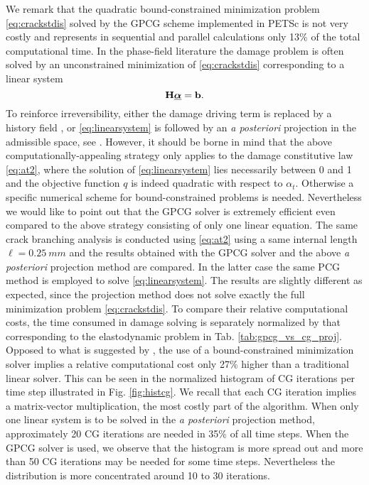 We remark that the quadratic bound-constrained minimization problem \eqref{eq:crackstdis} solved by the GPCG scheme implemented in PETSc is not very costly and represents in sequential and parallel calculations only 13\% of the total computational time. In the phase-field literature the damage problem is often solved by an unconstrained minimization of \eqref{eq:crackstdis} corresponding to a linear system
\begin{equation} \label{eq:linearsystem}
\vec{H}\dvec=\vec{b}.
\end{equation}
To reinforce irreversibility, either the damage driving term is replaced by a history field \cite{HofackerMiehe:2012,BordenVerhooselScottHughesLandis:2012}, or \eqref{eq:linearsystem} is followed by an \emph{a posteriori} projection in the admissible space, see \cite{LancioniRoyer-Carfagni:2009}. However, it should be borne in mind that the above computationally-appealing strategy only applies to the damage constitutive law \eqref{eq:at2}, where the solution of \eqref{eq:linearsystem} lies necessarily between 0 and 1 and the objective function $q$ is indeed quadratic with respect to $\alpha_t$. Otherwise a specific numerical scheme for bound-constrained problems is needed. Nevertheless we would like to point out that the GPCG solver is extremely efficient even compared to the above strategy consisting of only one linear equation. The same crack branching analysis is conducted using \eqref{eq:at2} using a same internal length $\ell=\SI{0.25}{mm}$ and the results obtained with the GPCG solver and the above \emph{a posteriori} projection method are compared. In the latter case the same PCG method is employed to solve \eqref{eq:linearsystem}. The results are slightly different as expected, since the projection method does not solve exactly the full minimization problem \eqref{eq:crackstdis}. To compare their relative computational costs, the time consumed in damage solving is separately normalized by that corresponding to the elastodynamic problem in Tab. \ref{tab:gpcg_vs_cg_proj}. Opposed to what is suggested by \cite{AmorMarigoMaurini:2009}, the use of a bound-constrained minimization solver implies a relative computational cost only 27\% higher than a traditional linear solver. This can be seen in the normalized histogram of CG iterations per time step illustrated in Fig. \ref{fig:histcg}. We recall that each CG iteration implies a matrix-vector multiplication, the most costly part of the algorithm. When only one linear system is to be solved in the \emph{a posteriori} projection method, approximately 20 CG iterations are needed in 35\% of all time steps. When the GPCG solver is used, we observe that the histogram is more spread out and more than 50 CG iterations may be needed for some time steps. Nevertheless the distribution is more concentrated around 10 to 30 iterations.
